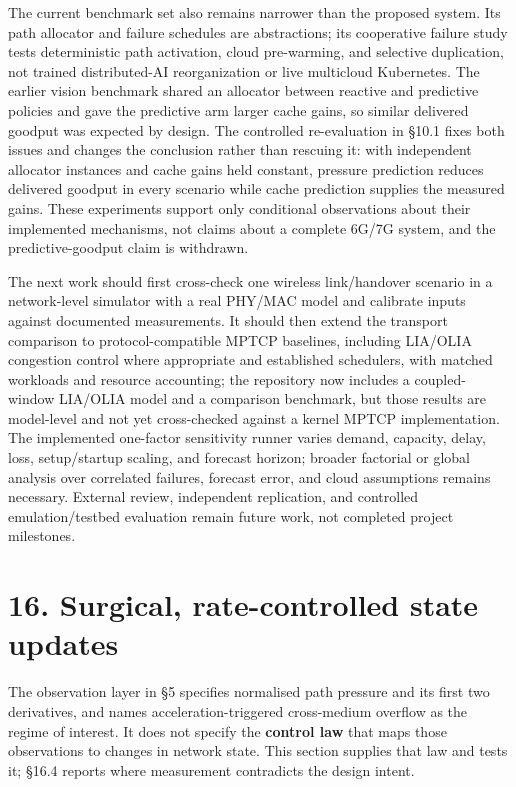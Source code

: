 \documentclass[
  american,
  11pt,
]{article}
\begin{document}
The current benchmark set also remains narrower than the proposed
system. Its path allocator and failure schedules are abstractions; its
cooperative failure study tests deterministic path activation, cloud
pre-warming, and selective duplication, not trained distributed-AI
reorganization or live multicloud Kubernetes. The earlier vision
benchmark shared an allocator between reactive and predictive policies
and gave the predictive arm larger cache gains, so similar delivered
goodput was expected by design. The controlled re-evaluation in §10.1
fixes both issues and changes the conclusion rather than rescuing it:
with independent allocator instances and cache gains held constant,
pressure prediction reduces delivered goodput in every scenario while
cache prediction supplies the measured gains. These experiments support
only conditional observations about their implemented mechanisms, not
claims about a complete 6G/7G system, and the predictive-goodput claim
is withdrawn.

The next work should first cross-check one wireless link/handover
scenario in a network-level simulator with a real PHY/MAC model and
calibrate inputs against documented measurements. It should then extend
the transport comparison to protocol-compatible MPTCP baselines,
including LIA/OLIA congestion control where appropriate and established
schedulers, with matched workloads and resource accounting; the
repository now includes a coupled-window LIA/OLIA model and a comparison
benchmark, but those results are model-level and not yet cross-checked
against a kernel MPTCP implementation. The implemented one-factor
sensitivity runner varies demand, capacity, delay, loss, setup/startup
scaling, and forecast horizon; broader factorial or global analysis over
correlated failures, forecast error, and cloud assumptions remains
necessary. External review, independent replication, and controlled
emulation/testbed evaluation remain future work, not completed project
milestones.

\section{16. Surgical, rate-controlled state
updates}\label{surgical-rate-controlled-state-updates}

The observation layer in §5 specifies normalised path pressure and its
first two derivatives, and names acceleration-triggered cross-medium
overflow as the regime of interest. It does not specify the
\textbf{control law} that maps those observations to changes in network
state. This section supplies that law and tests it; §16.4 reports where
measurement contradicts the design intent.
\end{document}
